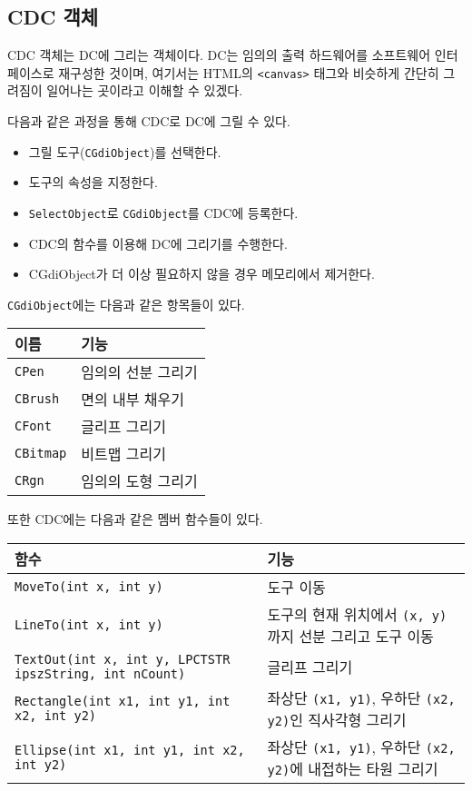 \subsection{CDC 객체}
CDC 객체는 DC에 그리는 객체이다.
DC는 임의의 출력 하드웨어를 소프트웨어 인터페이스로 재구성한 것이며, 여기서는 HTML의 \texttt{<canvas>} 태그와
비슷하게 간단히 그려짐이 일어나는 곳이라고 이해할 수 있겠다.

다음과 같은 과정을 통해 CDC로 DC에 그릴 수 있다.
\begin{itemize}
	\item 그릴 도구(\texttt{CGdiObject})를 선택한다.
	\item 도구의 속성을 지정한다.
	\item \texttt{SelectObject}로 \texttt{CGdiObject}를 CDC에 등록한다.
	\item CDC의 함수를 이용해 DC에 그리기를 수행한다.
	\item CGdiObject가 더 이상 필요하지 않을 경우 메모리에서 제거한다.
\end{itemize}

\texttt{CGdiObject}에는 다음과 같은 항목들이 있다.

\begin{tabularx}{\textwidth}{l|X}
	이름 & 기능 \\
	\hline
	\texttt{CPen} & 임의의 선분 그리기 \\
	\texttt{CBrush} & 면의 내부 채우기 \\
	\texttt{CFont} & 글리프 그리기 \\
	\texttt{CBitmap} & 비트맵 그리기 \\
	\texttt{CRgn} & 임의의 도형 그리기 \\
\end{tabularx}

또한 CDC에는 다음과 같은 멤버 함수들이 있다.

\begin{tabularx}{\textwidth}{l|X}
	함수 & 기능 \\
	\hline
	\texttt{MoveTo(int x, int y)} & 도구 이동 \\
	\texttt{LineTo(int x, int y)} & 도구의 현재 위치에서 \texttt{(x, y)}까지 선분 그리고 도구 이동 \\
	\texttt{TextOut(int x, int y, LPCTSTR ipszString, int nCount)} & 글리프 그리기 \\
	\texttt{Rectangle(int x1, int y1, int x2, int y2)} & 좌상단 \texttt{(x1, y1)}, 우하단 \texttt{(x2, y2)}인 직사각형 그리기 \\
	\texttt{Ellipse(int x1, int y1, int x2, int y2)} & 좌상단 \texttt{(x1, y1)}, 우하단 \texttt{(x2, y2)}에 내접하는 타원 그리기 \\
\end{tabularx}

